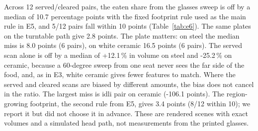 \begin{table}[t]\centering\small
\caption{E6: eaten share of the serving from a 13-frame head-mounted sweep (served and cleared), synthetic plates. Error in percentage points (pp).}
\label{tab:e6}
\setlength{\tabcolsep}{4pt}
\end{table}

Across 12 served/cleared pairs, the eaten share from the glasses sweep is off by a median of 10.7 percentage points with the fixed footprint rule used as the main rule in E5, and 5/12 pairs fall within 10 points (Table~\ref{tab:e6}). The same plates on the turntable path give 2.8 points. The plate matters: on steel the median miss is 8.0 points (6 pairs), on white ceramic 16.5 points (6 pairs). The served scan alone is off by a median of +12.1\,\% in volume on steel and -25.2\,\% on ceramic, because a 60-degree sweep from one seat never sees the far side of the food, and, as in E3, white ceramic gives fewer features to match. Where the served and cleared scans are biased by different amounts, the bias does not cancel in the ratio. The largest miss is idli pair on ceramic (-106.1 points). The region-growing footprint, the second rule from E5, gives 3.4 points (8/12 within 10); we report it but did not choose it in advance. These are rendered scenes with exact volumes and a simulated head path, not measurements from the printed glasses.
